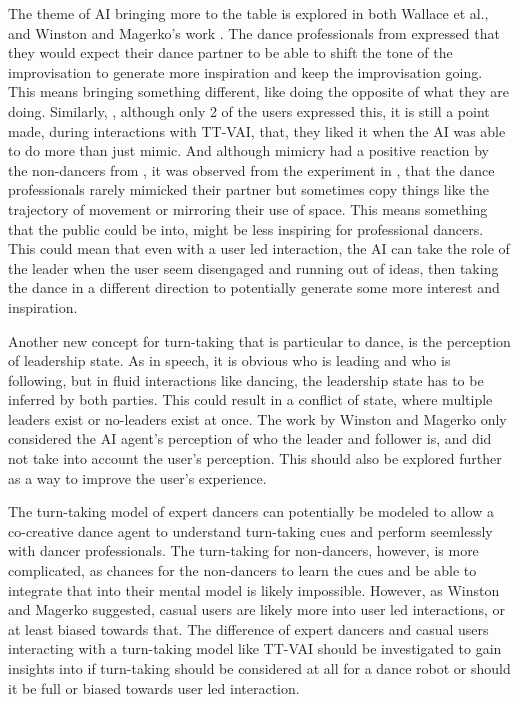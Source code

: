 \documentclass[final,5p,times,twocolumn,authoryear]{article}
\begin{document}
The theme of AI bringing more to the table is explored in both Wallace
et al., and Winston and Magerko's work \cite{Wallace2023Embody,
Winston2017}. The dance professionals from \cite{Wallace2023Embody}
expressed that they would expect their dance partner to be able to shift
the tone of the improvisation to generate more inspiration and keep the
improvisation going. This means bringing something different, like doing
the opposite of what they are doing. Similarly, \cite{Winston2017},
although only 2 of the users expressed this, it is still a point made,
during interactions with TT-VAI, that, they liked it when the AI was
able to do more than just mimic. And although mimicry
had a positive reaction by the non-dancers from \cite{Winston2017}, it
was observed from the experiment in \cite{Wallace2023Embody}, that the
dance professionals rarely mimicked their partner but sometimes copy
things like the trajectory of movement or mirroring their use of space.
This means something that the public could be into, might be less
inspiring for professional dancers. This could mean that even with a
user led interaction, the AI can take the role of the leader when the
user seem disengaged and running out of ideas, then taking the dance in
a different direction to potentially generate some more interest and inspiration.

Another new concept for turn-taking that is particular to dance, is the
perception of leadership state. As in speech, it is obvious who is
leading and who is following, but in fluid interactions like dancing,
the leadership state has to be inferred by both parties. This could
result in a conflict of state, where multiple leaders exist or
no-leaders exist at once. The work by Winston and Magerko only
considered the AI agent's perception of who the leader and follower is,
and did not take into account the user's perception. This should also be
explored further as a way to improve the user's experience.

The turn-taking model of expert dancers can potentially be modeled to
allow a co-creative dance agent to understand turn-taking cues and
perform seemlessly with dancer professionals. The turn-taking for
non-dancers, however, is more complicated, as chances for the
non-dancers to learn the cues and be able to integrate that into their
mental model is likely impossible. However, as Winston and Magerko
suggested, casual users are likely more into user led interactions, or
at least biased towards that. The difference of expert dancers and
casual users interacting with a turn-taking model like TT-VAI should be
investigated to gain insights into if turn-taking should be considered
at all for a dance robot or should it be full or biased towards user led interaction.
\end{document}
